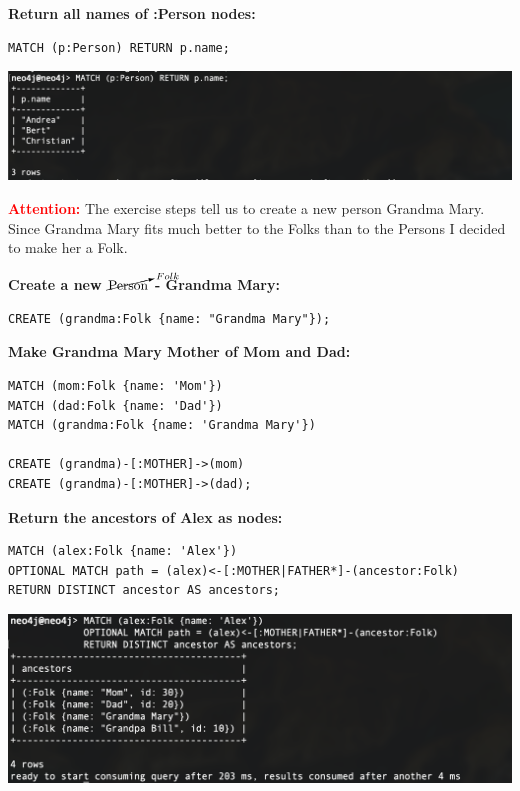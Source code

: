 \documentclass[14pt,a4paper]{extarticle}
\begin{document}
	\noindent \textbf{Return all names of :Person nodes:}
	\begin{lstlisting}[style=sql]
MATCH (p:Person) RETURN p.name;
	\end{lstlisting}
	\includegraphics[width=\textwidth]{images/sc03.png}

	\vspace{0.5cm}
	\noindent \textcolor{red}{\textbf{Attention:}} The exercise steps tell us to create a new person Grandma Mary.
	Since Grandma Mary fits much better to the Folks than to the Persons I decided to make her a Folk.
	\vspace{0.2cm}

	\noindent \textbf{Create a new $\cancelto{Folk}{\textrm{Person}}$ - Grandma Mary:}
	\begin{lstlisting}[style=sql]
CREATE (grandma:Folk {name: "Grandma Mary"});
	\end{lstlisting}

	\noindent \textbf{Make Grandma Mary Mother of Mom and Dad:}
	\begin{lstlisting}[style=sql]
MATCH (mom:Folk {name: 'Mom'})
MATCH (dad:Folk {name: 'Dad'})
MATCH (grandma:Folk {name: 'Grandma Mary'})

CREATE (grandma)-[:MOTHER]->(mom)
CREATE (grandma)-[:MOTHER]->(dad);
	\end{lstlisting}

	\pagebreak

	\noindent \textbf{Return the ancestors of Alex as nodes:}
	\begin{lstlisting}[style=sql]
MATCH (alex:Folk {name: 'Alex'})
OPTIONAL MATCH path = (alex)<-[:MOTHER|FATHER*]-(ancestor:Folk)
RETURN DISTINCT ancestor AS ancestors;
	\end{lstlisting}
	\includegraphics[width=\textwidth]{images/sc04.png}
\end{document}
